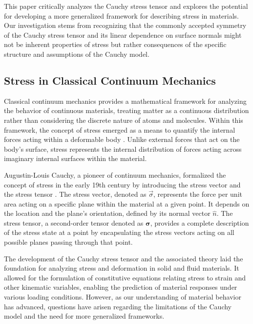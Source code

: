 \documentclass[12pt,a4paper,english]{article}
\begin{document}
This paper critically analyzes the Cauchy stress tensor and explores the potential for developing a more generalized framework for describing stress in materials. Our investigation stems from recognizing that the commonly accepted symmetry of the Cauchy stress tensor and its linear dependence on surface normals might not be inherent properties of stress but rather consequences of the specific structure and assumptions of the Cauchy model. 

\subsection{Stress in Classical Continuum Mechanics} %

Classical continuum mechanics provides a mathematical framework for analyzing the behavior of continuous materials, treating matter as a continuous distribution rather than considering the discrete nature of atoms and molecules. Within this framework, the concept of stress emerged as a means to quantify the internal forces acting within a deformable body \cite{truesdell2004non, marsden1994mathematical}. Unlike external forces that act on the body's surface, stress represents the internal distribution of forces acting across imaginary internal surfaces within the material.

Augustin-Louis Cauchy, a pioneer of continuum mechanics, formalized the concept of stress in the early 19th century by introducing the stress vector and the stress tensor \cite{truesdell2004non}. The stress vector, denoted as $\vec{\sigma}$, represents the force per unit area acting on a specific plane within the material at a given point. It depends on the location and the plane's orientation, defined by its normal vector $\hat{n}$. The stress tensor, a second-order tensor denoted as $\boldsymbol{\sigma}$, provides a complete description of the stress state at a point by encapsulating the stress vectors acting on all possible planes passing through that point.

The development of the Cauchy stress tensor and the associated theory laid the foundation for analyzing stress and deformation in solid and fluid materials. It allowed for the formulation of constitutive equations relating stress to strain and other kinematic variables, enabling the prediction of material responses under various loading conditions. However, as our understanding of material behavior has advanced, questions have arisen regarding the limitations of the Cauchy model and the need for more generalized frameworks.
\end{document}
